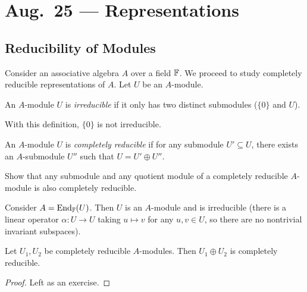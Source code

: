 \chapter{Aug.~25 --- Representations}

\section{Reducibility of Modules}

\begin{remark}
  Consider an associative algebra
  $A$ over a field $\mathbb{F}$. We proceed
  to study completely reducible
  representations of $A$.
  Let $U$ be an $A$-module.
\end{remark}

\begin{definition}
  An $A$-module $U$ is \emph{irreducible}
  if it only has two distinct submodules
  ($\{0\}$ and $U$).
\end{definition}

\begin{remark}
  With this definition, $\{0\}$ is
  not irreducible.
\end{remark}

\begin{definition}
  An $A$-module $U$ is \emph{completely reducible}
  if for any submodule $U' \subseteq U$,
  there exists an $A$-submodule
  $U''$ such that $U = U' \oplus U''$.
\end{definition}

\begin{exercise}
  Show that any submodule and any quotient
  module of a completely reducible
  $A$-module is also completely reducible.
\end{exercise}

\begin{example}
  Consider $A = \operatorname{End}_{\mathbb{F}}(U)$. Then $U$ is
  an $A$-module and is irreducible
  (there is a linear operator
  $\alpha : U \to U$ taking
  $u \mapsto v$ for any $u, v \in U$, so
  there are no nontrivial invariant
  subspaces).
\end{example}

\begin{prop}
  Let $U_1, U_2$ be completely reducible
  $A$-modules. Then $U_1 \oplus U_2$ is
  completely reducible.
\end{prop}

\begin{proof}
  Left as an exercise.
\end{proof}

